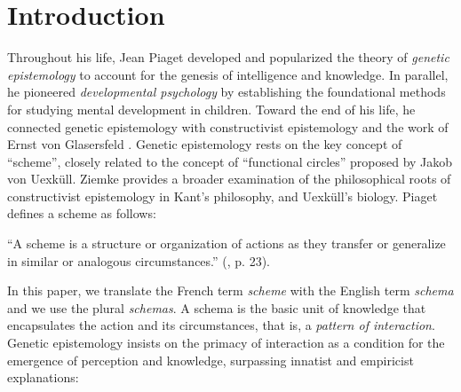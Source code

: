\documentclass[runningheads]{llncs}
\begin{document}
\section{Introduction}


Throughout his life, Jean Piaget developed and popularized the theory of \textit{genetic epistemology} \cite{piaget_principles_1997}  to account for the genesis of intelligence and knowledge. 
In parallel, he pioneered \textit{developmental psychology} by establishing the foundational methods for studying mental development in children.
Toward the end of his life, he connected genetic epistemology with constructivist epistemology and the work of Ernst von Glasersfeld \cite{glasersfeld_radical_1997}. 
Genetic epistemology rests on the key concept of ``scheme'', closely related to the concept of ``functional circles'' proposed by Jakob von Uexküll.
Ziemke \cite{ziemke_construction_2001} provides a broader examination of the philosophical roots of constructivist epistemology in Kant's philosophy, and Uexküll's biology.  
Piaget defines a scheme as follows: 
\\

\begin{adjustwidth}{1cm}{1cm}
``A scheme is a structure or organization of actions as they transfer or generalize in similar or analogous circumstances.'' 
(\cite{piaget_naissance_1998}, p. 23).
\\ 
\end{adjustwidth}

In this paper, we translate the French term \textit{scheme} with the English term \textit{schema} and we use the plural \textit{schemas}. 
A schema is the basic unit of knowledge that encapsulates the action and its circumstances, that is, a \textit{pattern of interaction}. 
Genetic epistemology insists on the primacy of interaction as a condition for the emergence of perception and knowledge, 
surpassing innatist and empiricist explanations:
\\
\end{document}
